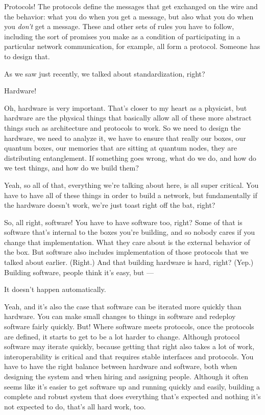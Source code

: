 Protocols! The protocols define the messages that get exchanged on the wire and the behavior: what you do when you get a message, but also what you do when you \emph{don't} get a message. These and other sets of rules you have to follow, including the sort of promises you make as a condition of participating in a particular network communication, for example, all form a protocol. Someone has to design that.

As we saw just recently, we talked about standardization, right?

Hardware!

\mmm Oh, hardware is very important. That's closer to my heart as a physicist, but hardware are the physical things that basically allow all of these more abstract things such as architecture and protocols to work. So we need to design the hardware, we need to analyze it, we have to ensure that really our boxes, our quantum boxes, our memories that are sitting at quantum nodes, they are distributing entanglement. If something goes wrong, what do we do, and how do we test things, and how do we build them?

\rrr Yeah, so all of that, everything we're talking about here, is all super critical. You have to have all of these things in order to build a network, but fundamentally if the hardware doesn't work, we're just toast right off the bat, right?

So, all right, software! You have to have software too, right? Some of that is software that's internal to the boxes you're building, and so nobody cares if you change that implementation. What they care about is the external behavior of the box. But software also includes implementation of those protocols that we talked about earlier. (Right.) And that building hardware is hard, right? (Yep.) Building software, people think it's easy, but ---

\mmm It doesn't happen automatically.

\rrr Yeah, and it's also the case that software can be iterated more quickly than hardware. You can make small changes to things in software and redeploy software fairly quickly. But! Where software meets protocols, once the protocols are defined, it starts to get to be a lot harder to change. Although protocol software may iterate quickly, because getting that right also takes a lot of work, interoperability is critical and that requires stable interfaces and protocols. You have to have the right balance between hardware and software, both when designing the system and when hiring and assigning people. Although it often seems like it's easier to get software up and running quickly and easily, building a complete and robust system that does everything that's expected and nothing it's not expected to do, that's all hard work, too.

